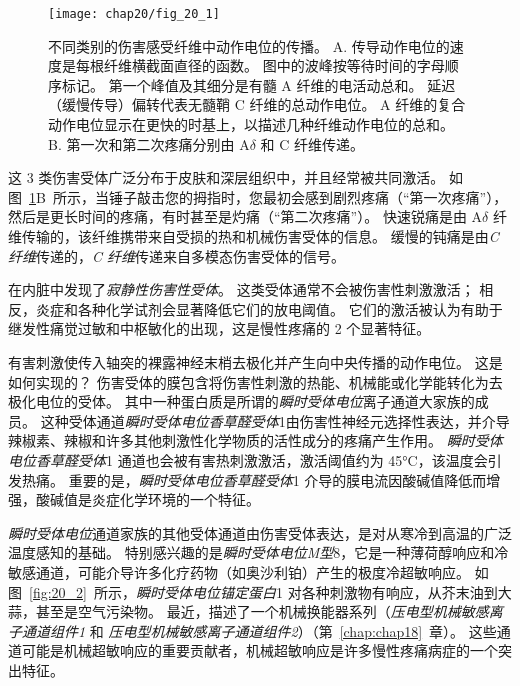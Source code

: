 \begin{figure}[htbp]
	\centering
	\texttt{[image: chap20/fig\_20\_1]}
	\caption{不同类别的伤害感受纤维中动作电位的传播。 
		A. 传导动作电位的速度是每根纤维横截面直径的函数。
		图中的波峰按等待时间的字母顺序标记。
		第一个峰值及其细分是有髓 A 纤维的电活动总和。
		延迟（缓慢传导）偏转代表无髓鞘 C 纤维的总动作电位。
		A 纤维的复合动作电位显示在更快的时基上，以描述几种纤维动作电位的总和\cite{perl2007ideas}。
		B. 第一次和第二次疼痛分别由 A$\delta$ 和 C 纤维传递\cite{fields1987painful}。}
	\label{fig:20_1}
\end{figure}


这 3 类伤害受体广泛分布于皮肤和深层组织中，并且经常被共同激活。
如图~\ref{fig:20_1}B~所示，当锤子敲击您的拇指时，您最初会感到剧烈疼痛（“第一次疼痛”），然后是更长时间的疼痛，有时甚至是灼痛（“第二次疼痛”）。
快速锐痛是由 A$ \delta $ 纤维传输的，该纤维携带来自受损的热和机械伤害受体的信息。
缓慢的钝痛是由\textit{C 纤维}传递的，\textit{C 纤维}传递来自多模态伤害受体的信号。


在内脏中发现了\textit{寂静性伤害性受体}。
这类受体通常不会被伤害性刺激激活；
相反，炎症和各种化学试剂会显著降低它们的放电阈值。
它们的激活被认为有助于继发性痛觉过敏和中枢敏化的出现，这是慢性疼痛的 2 个显著特征。


有害刺激使传入轴突的裸露神经末梢去极化并产生向中央传播的动作电位。
这是如何实现的？
伤害受体的膜包含将伤害性刺激的热能、机械能或化学能转化为去极化电位的受体。
其中一种蛋白质是所谓的\textit{瞬时受体电位}离子通道大家族的成员。
这种受体通道\textit{瞬时受体电位香草醛受体}1由伤害性神经元选择性表达，并介导辣椒素、辣椒和许多其他刺激性化学物质的活性成分的疼痛产生作用。
\textit{瞬时受体电位香草醛受体}1 通道也会被有害热刺激激活，激活阈值约为 45°C，该温度会引发热痛。
重要的是，\textit{瞬时受体电位香草醛受体}1 介导的膜电流因酸碱值降低而增强，酸碱值是炎症化学环境的一个特征。


\textit{瞬时受体电位}通道家族的其他受体通道由伤害受体表达，是对从寒冷到高温的广泛温度感知的基础。
特别感兴趣的是\textit{瞬时受体电位M型}8，它是一种薄荷醇响应和冷敏感通道，可能介导许多化疗药物（如奥沙利铂）产生的极度冷超敏响应。
如图~\ref{fig:20_2}~所示，\textit{瞬时受体电位锚定蛋白}1 对各种刺激物有响应，从芥末油到大蒜，甚至是空气污染物。
最近，描述了一个机械换能器系列（\textit{压电型机械敏感离子通道组件1} 和 \textit{压电型机械敏感离子通道组件2}）（第~\ref{chap:chap18}~章）。
这些通道可能是机械超敏响应的重要贡献者，机械超敏响应是许多慢性疼痛病症的一个突出特征。


